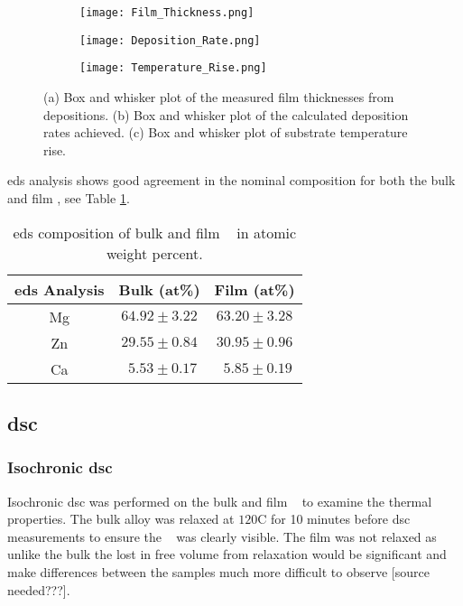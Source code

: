 \documentclass[draft,a4paper,12pt,oneside]{article}%
\begin{document}
\begin{figure}[h]
	\centering
	\begin{subfigure}[htbp]{0.32\textwidth}
		\texttt{[image: Film\_Thickness.png]}
		\caption{}
		\label{fig:Film_Thickness}
	\end{subfigure}
	\begin{subfigure}[htbp]{0.32\textwidth}
		\texttt{[image: Deposition\_Rate.png]}
		\caption{}
		\label{fig:Deposition_Rate}
	\end{subfigure}
\begin{subfigure}[htbp]{0.32\textwidth}
	\texttt{[image: Temperature\_Rise.png]}
	\caption{}
	\label{fig:Temperature_Rise}
\end{subfigure}
	\caption{(a) Box and whisker plot of the measured film thicknesses from depositions. (b) Box and whisker plot of the calculated deposition rates achieved. (c) Box and whisker plot of substrate temperature rise.}%
	\label{fig:Film_Thickness_DepRate}
\end{figure}

\acrshort{eds} analysis shows good agreement in the nominal composition for both the bulk and film \MgZnCa, see Table \ref{tab:EDS_Composition}.

\begin{table}[h]
	\centering
	\caption{\acrshort{eds} composition of bulk and film \MgZnCa~ in atomic weight percent.}
	\begin{tabular}{ c c c }
		\toprule
		\acrshort{eds} Analysis & Bulk (at\%)  & Film (at\%)  \\
		\midrule
		Mg & $64.92 \pm 3.22$ & $63.20 \pm 3.28$ \\
		Zn & $29.55 \pm 0.84$ & $30.95 \pm 0.96$ \\
		Ca & $~~ 5.53 \pm 0.17$ & $~~ 5.85 \pm 0.19$ \\ 
		\bottomrule
	\end{tabular}
	\label{tab:EDS_Composition}
\end{table}

\subsection{\acrshort{dsc}}
\subsubsection{Isochronic \acrshort{dsc}}
Isochronic \acrshort{dsc} was performed on the bulk and film \MgZnCa~ to examine the thermal properties. The bulk alloy was relaxed at $120$\degree C for 10 minutes before \acrshort{dsc} measurements to ensure the \Tg~ was clearly visible. The film was not relaxed as unlike the bulk the lost in free volume from relaxation would be significant and make differences between the samples much more difficult to observe [source needed???]. 
\end{document}
